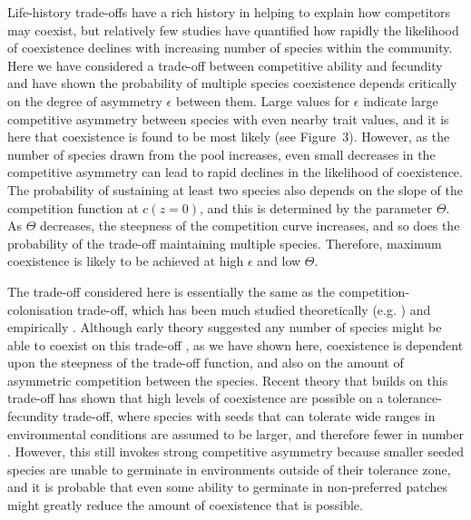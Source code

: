 Life-history trade-offs have a rich history in helping to explain how competitors may coexist, but relatively few studies have quantified how rapidly the likelihood of coexistence declines with increasing number of species within the community. Here we have considered a trade-off between competitive ability and fecundity and have shown the probability of multiple species coexistence depends critically on the degree of asymmetry $\epsilon$ between them. Large values for $\epsilon$ indicate large competitive asymmetry between species with even nearby trait values, and it is here that coexistence is found to be most likely (see Figure~3). However, as the number of species drawn from the pool increases, even small decreases in the competitive asymmetry can lead to rapid declines in the likelihood of coexistence. The probability of sustaining at least two species also depends on the slope of the competition function at $c(z=0)$, and this is determined by the parameter $\Theta$. As $\Theta$ decreases, the steepness of the competition curve increases, and so does the probability of the trade-off maintaining multiple species. Therefore, maximum coexistence is likely to be achieved at high $\epsilon$ and low $\Theta$.

The trade-off considered here is essentially the same as the competition-colonisation trade-off, which has been much studied theoretically (e.g.  \cite{levin1974disturbance, hastings1980disturbance, tilman1994competition}) and empirically \citep[e.g.][]{turnbull1999seed, robinson1995invasibility, cadotte2007competition}. Although early theory suggested any number of species might be able to coexist on this trade-off \citep{may1994superinfection, tilman1994competition}, as we have shown here, coexistence is dependent upon the steepness of the trade-off function, and also on the amount of asymmetric competition between the species. Recent theory that builds on this trade-off has shown that high levels of coexistence are possible on a tolerance-fecundity trade-off, where species with seeds that can tolerate wide ranges in environmental conditions are assumed to be larger, and therefore fewer in number \citep{muller2010tolerance}. However, this still invokes strong competitive asymmetry because smaller seeded species are unable to germinate in environments outside of their tolerance zone, and it is probable that even some ability to germinate in non-preferred patches might greatly reduce the amount of coexistence that is possible.

